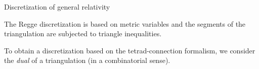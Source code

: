 \documentclass{beamer}
\newcommand\italictext[1]{\textcolor{italics}{\textit{#1}}}
\begin{document}
\begin{frame}{Discretization of general relativity}
    \begin{list}{\maltese}{\leftmargin=1em \itemindent=0em}
        \item<1-> The Regge discretization is based on metric variables and the segments of the triangulation are subjected to triangle inequalities.
        \item<2-> To obtain a discretization based on the tetrad-connection formalism, we consider the \italictext{dual} of a triangulation (in a combinatorial sense). 
        \item<3-> \noindent
        \begin{minipage}{\linewidth}
            \begin{columns}
                \vtop{\begin{itemize}{\leftmargin=0em \itemindent=0em}

\end{itemize}}
\end{columns}
\end{minipage}
\end{list}
\end{frame}
\end{document}
